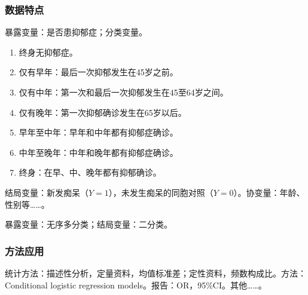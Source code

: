 \subsubsection{数据特点}
暴露变量：是否患抑郁症；分类变量。
\begin{enumerate}
\item 终身无抑郁症。
\item 仅有早年：最后一次抑郁发生在45岁之前。
\item 仅有中年：第一次和最后一次抑郁发生在45至64岁之间。
\item 仅有晚年：第一次抑郁确诊发生在65岁以后。
\item 早年至中年：早年和中年都有抑郁症确诊。
\item 中年至晚年：中年和晚年都有抑郁症确诊。
\item 终身：在早、中、晚年都有抑郁确诊。
\end{enumerate}
结局变量：新发痴呆（$Y=1$），未发生痴呆的同胞对照（$Y=0$）。协变量：年龄、性别等……。
\begin{annotation}暴露变量：无序多分类；结局变量：二分类。\end{annotation}
\subsubsection{方法应用}
统计方法：描述性分析，定量资料，均值标准差；定性资料，频数构成比。方法：Conditional logistic regression models。报告：OR，95\%CI。其他……。
